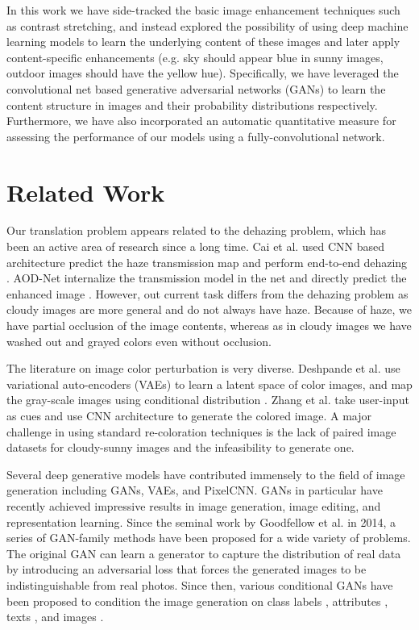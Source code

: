 \documentclass[10pt,twocolumn,letterpaper]{article}
\begin{document}
In this work we have side-tracked the basic image enhancement techniques such as contrast stretching, and instead explored the possibility of using deep machine learning models to learn the underlying content of these images and later apply content-specific enhancements (e.g. sky should appear blue in sunny images, outdoor images should have the yellow hue). Specifically, we have leveraged the convolutional net based  generative adversarial networks (GANs) to learn the content structure in images and their probability distributions respectively. Furthermore, we have also incorporated an automatic quantitative measure for assessing the performance of our models using a fully-convolutional network.

\section{Related Work}
Our translation problem appears related to the dehazing problem, which has been an active area of research since a long time. Cai et al. used CNN based architecture predict the haze transmission map and perform end-to-end dehazing \cite{cai2016dehazenet}. AOD-Net internalize the transmission model in the net and directly predict the enhanced image \cite{li2017aod}. However, out current task differs from the dehazing problem as cloudy images are more general and do not always have haze. Because of haze, we have partial occlusion of the image contents, whereas as in cloudy images we have washed out and grayed colors even without occlusion.

The literature on image color perturbation is very diverse. Deshpande et al. use variational auto-encoders (VAEs) to learn a latent space of color images, and map the gray-scale images using conditional distribution \cite{deshpande2017learning}. Zhang et al. take user-input as cues and use CNN architecture to generate the colored image. A major challenge in using standard re-coloration techniques is the lack of paired image datasets for cloudy-sunny images and the infeasibility to generate one.

Several deep generative models have contributed immensely to the field of image generation including GANs, VAEs, and PixelCNN. GANs in particular have recently achieved impressive results in image generation, image editing, and representation learning. Since the seminal work by Goodfellow et al. \cite{goodfellow2014generative} in 2014, a series of GAN-family methods have been proposed for a wide variety of problems. The original GAN can learn a generator to capture the distribution of real data by introducing an adversarial loss that forces the generated images to be indistinguishable from real photos. Since then, various conditional GANs have been proposed to condition the image generation on class labels \cite{mirza2014conditional}, attributes \cite{perarnau2016invertible}, texts \cite{reed2016generative}, and images \cite{ledig2017photo,li2016precomputed}. 
\end{document}
